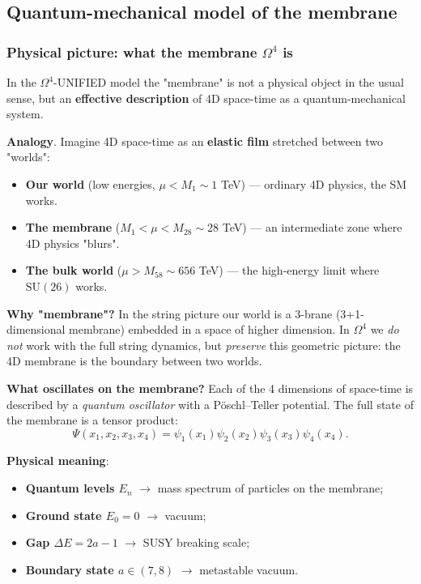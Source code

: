 \documentclass[11pt,a4paper]{article}
\newcommand{\SU}{\ensuremath{\mathrm{SU}}}
\newcommand{\Om}{\ensuremath{\Omega^4}}
\theoremstyle{definition}
\begin{document}
\subsection{Quantum-mechanical model of the membrane}
\label{subsec:membrane-model}

\subsubsection{Physical picture: what the membrane \texorpdfstring{$\Omega^4$}{Omega4} is}
\label{subsubsec:membrane-picture}

In the $\Om$-UNIFIED model the "membrane" is not a physical object
in the usual sense, but an \textbf{effective description} of 4D space-time
as a quantum-mechanical system.

\medskip\noindent
\textbf{Analogy}. Imagine 4D space-time as an
\textbf{elastic film} stretched between two "worlds":
\begin{itemize}
    \item \textbf{Our world} (low energies, $\mu < M_1 \sim 1$ TeV) ---
          ordinary 4D physics, the SM works.
    \item \textbf{The membrane} ($M_1 < \mu < M_{28} \sim 28$ TeV) ---
          an intermediate zone where 4D physics "blurs".
    \item \textbf{The bulk world} ($\mu > M_{58} \sim 656$ TeV) ---
          the high-energy limit where $\SU(26)$ works.
\end{itemize}

\medskip\noindent
\textbf{Why "membrane"?} In the string picture our world is
a 3-brane (3+1-dimensional membrane) embedded in a space
of higher dimension. In $\Om$ we \emph{do not} work with the full
string dynamics, but \emph{preserve} this geometric picture:
the 4D membrane is the boundary between two worlds.

\medskip\noindent
\textbf{What oscillates on the membrane?} Each of the 4 dimensions
of space-time is described by a \emph{quantum oscillator}
with a P\"oschl--Teller potential. The full state of the membrane is
a tensor product:
\begin{equation}
    \Psi(x_1, x_2, x_3, x_4) = \psi_1(x_1)\psi_2(x_2)\psi_3(x_3)\psi_4(x_4).
\end{equation}

\medskip\noindent
\textbf{Physical meaning}:
\begin{itemize}
    \item \textbf{Quantum levels $E_n$} $\to$ mass spectrum of particles on the membrane;
    \item \textbf{Ground state $E_0 = 0$} $\to$ vacuum;
    \item \textbf{Gap $\Delta E = 2a-1$} $\to$ SUSY breaking scale;
    \item \textbf{Boundary state $a \in (7, 8)$} $\to$ metastable vacuum.
\end{itemize}
                                  
\end{document}
